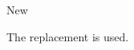 \documentclass{article}
\newcommand{\word}{Old}
\renewcommand{\word}{New}
\begin{document}
\word

The replacement is used.
\end{document}
